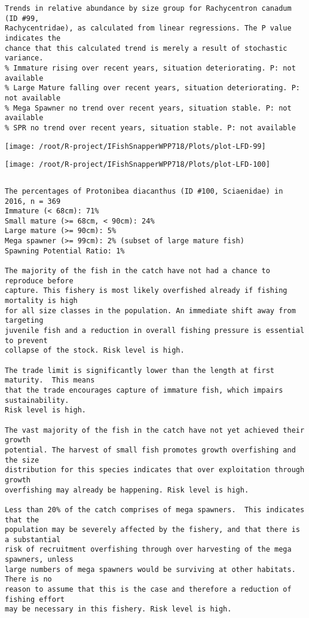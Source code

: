 \documentclass{report}\usepackage[]{graphicx}\usepackage[]{color}
\makeatletter
\def\maxwidth{ %
  \ifdim\Gin@nat@width>\linewidth
    \linewidth
  \else
    \Gin@nat@width
  \fi
}
\newenvironment{kframe}{%
 \def\at@end@of@kframe{}%
 \ifinner\ifhmode%
  \def\at@end@of@kframe{\end{minipage}}%
  \begin{minipage}{\columnwidth}%
 \fi\fi%
 \def\FrameCommand##1{\hskip\@totalleftmargin \hskip-\fboxsep
 \colorbox{shadecolor}{##1}\hskip-\fboxsep
     \hskip-\linewidth \hskip-\@totalleftmargin \hskip\columnwidth}%
 \MakeFramed {\advance\hsize-\width
   \@totalleftmargin\z@ \linewidth\hsize
   \@setminipage}}%
 {\par\unskip\endMakeFramed%
 \at@end@of@kframe}
\newenvironment{knitrout}{}{} %
\makeatother
\begin{document}
\begin{knitrout}
\begin{kframe}
\begin{verbatim}
Trends in relative abundance by size group for Rachycentron canadum (ID #99,
Rachycentridae), as calculated from linear regressions. The P value indicates the
chance that this calculated trend is merely a result of stochastic variance.
% Immature rising over recent years, situation deteriorating. P: not available
% Large Mature falling over recent years, situation deteriorating. P: not available
% Mega Spawner no trend over recent years, situation stable. P: not available
% SPR no trend over recent years, situation stable. P: not available
\end{verbatim}
\end{kframe}
\texttt{[image: /root/R-project/IFishSnapperWPP718/Plots/plot-LFD-99]} 

\texttt{[image: /root/R-project/IFishSnapperWPP718/Plots/plot-LFD-100]} 
\begin{kframe}\begin{verbatim}
\end{verbatim}
\end{kframe}
\clearpage
\newpage
\begin{kframe}\begin{verbatim}The percentages of Protonibea diacanthus (ID #100, Sciaenidae) in 2016, n = 369
Immature (< 68cm): 71%
Small mature (>= 68cm, < 90cm): 24%
Large mature (>= 90cm): 5%
Mega spawner (>= 99cm): 2% (subset of large mature fish)
Spawning Potential Ratio: 1%
 
The majority of the fish in the catch have not had a chance to reproduce before
capture. This fishery is most likely overfished already if fishing mortality is high
for all size classes in the population. An immediate shift away from targeting
juvenile fish and a reduction in overall fishing pressure is essential to prevent
collapse of the stock. Risk level is high.

The trade limit is significantly lower than the length at first maturity.  This means
that the trade encourages capture of immature fish, which impairs sustainability.
Risk level is high.

The vast majority of the fish in the catch have not yet achieved their growth
potential. The harvest of small fish promotes growth overfishing and the size
distribution for this species indicates that over exploitation through growth
overfishing may already be happening. Risk level is high.

Less than 20% of the catch comprises of mega spawners.  This indicates that the
population may be severely affected by the fishery, and that there is a substantial
risk of recruitment overfishing through over harvesting of the mega spawners, unless
large numbers of mega spawners would be surviving at other habitats. There is no
reason to assume that this is the case and therefore a reduction of fishing effort
may be necessary in this fishery. Risk level is high.
 

\end{verbatim}
\end{kframe}
\end{knitrout}
\end{document}

